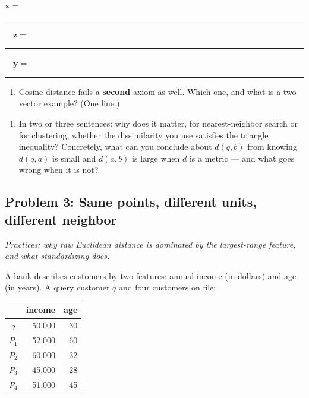 \documentclass[
  11pt,
]{article}
\providecommand{\tightlist}{%
  \setlength{\itemsep}{0pt}\setlength{\parskip}{0pt}}
\newcommand{\answerspace}[1]{\par\vspace*{#1}}  %
\newcommand{\blank}[1][1.2in]{\rule{#1}{0.4pt}}
\newcommand{\answerpage}{\clearpage}
\begin{document}
\(\mathbf{x} =\) \blank[0.9in] \(\quad \mathbf{z} =\)
\blank[0.9in] \(\quad \mathbf{y} =\) \blank[0.9in]

\answerspace{2.3in}

\begin{enumerate}
\def\labelenumi{(\alph{enumi})}
\setcounter{enumi}{2}
\tightlist
\item
  Cosine distance fails a \textbf{second} axiom as well. Which one, and
  what is a two-vector example? (One line.)
\end{enumerate}

\answerspace{1in}

\begin{enumerate}
\def\labelenumi{(\alph{enumi})}
\setcounter{enumi}{3}
\tightlist
\item
  In two or three sentences: why does it matter, for nearest-neighbor
  search or for clustering, whether the dissimilarity you use satisfies
  the triangle inequality? Concretely, what can you conclude about
  \(d(q,b)\) from knowing \(d(q,a)\) is small and \(d(a,b)\) is large
  when \(d\) is a metric --- and what goes wrong when it is not?
\end{enumerate}

\answerspace{1.8in}

\answerpage

\subsection{Problem 3: Same points, different units, different
neighbor}\label{problem-3-same-points-different-units-different-neighbor}

\emph{Practices: why raw Euclidean distance is dominated by the
largest-range feature, and what standardizing does.}

A bank describes customers by two features: annual income (in dollars)
and age (in years). A query customer \(q\) and four customers on file:

\begin{longtable}[]{@{}crr@{}}
\toprule\noalign{}
& income & age \\
\midrule\noalign{}
\endhead
\bottomrule\noalign{}
\endlastfoot
\(q\) & 50,000 & 30 \\
\(P_1\) & 52,000 & 60 \\
\(P_2\) & 60,000 & 32 \\
\(P_3\) & 45,000 & 28 \\
\(P_4\) & 51,000 & 45 \\
\end{longtable}
\end{document}
